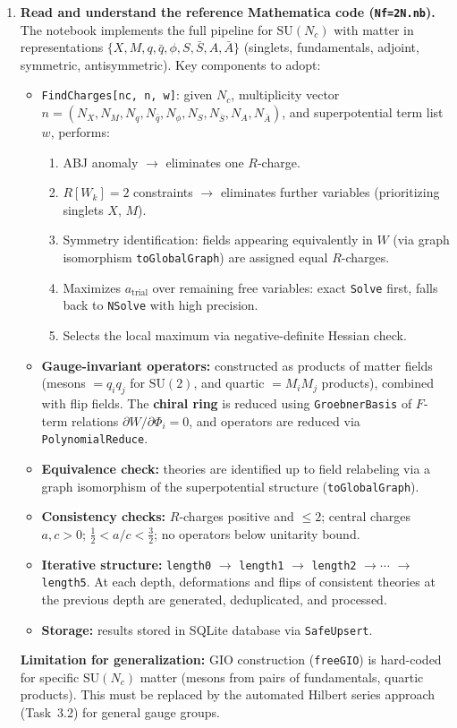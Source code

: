\documentclass[12pt]{article}
\begin{document}
\begin{enumerate}[label=\textbf{0.\arabic*}]
\item \textbf{Read and understand the reference Mathematica code (\texttt{Nf=2N.nb}).} \\
  The notebook implements the full pipeline for $\mathrm{SU}(N_c)$ with matter in
  representations $\{X, M, q, \bar{q}, \phi, S, \bar{S}, A, \bar{A}\}$
  (singlets, fundamentals, adjoint, symmetric, antisymmetric).
  Key components to adopt:
  \begin{itemize}
    \item \texttt{FindCharges[nc, n, w]}: given $N_c$, multiplicity vector $n = (N_X, N_M, N_q, N_{\bar{q}}, N_\phi, N_S, N_{\bar{S}}, N_A, N_{\bar{A}})$, and superpotential term list $w$, performs:
    \begin{enumerate}[label=\arabic*.]
      \item ABJ anomaly $\to$ eliminates one $R$-charge.
      \item $R[W_k] = 2$ constraints $\to$ eliminates further variables (prioritizing singlets $X$, $M$).
      \item Symmetry identification: fields appearing equivalently in $W$ (via graph isomorphism \texttt{toGlobalGraph}) are assigned equal $R$-charges.
      \item Maximizes $a_{\mathrm{trial}}$ over remaining free variables: exact \texttt{Solve} first, falls back to \texttt{NSolve} with high precision.
      \item Selects the local maximum via negative-definite Hessian check.
    \end{enumerate}
    \item \textbf{Gauge-invariant operators:} constructed as products of matter fields (mesons $= q_i q_j$ for $\mathrm{SU}(2)$, and quartic $= M_i M_j$ products), combined with flip fields. The \textbf{chiral ring} is reduced using \texttt{GroebnerBasis} of $F$-term relations $\partial W / \partial \Phi_i = 0$, and operators are reduced via \texttt{PolynomialReduce}.
    \item \textbf{Equivalence check:} theories are identified up to field relabeling via a graph isomorphism of the superpotential structure (\texttt{toGlobalGraph}).
    \item \textbf{Consistency checks:} $R$-charges positive and $\leq 2$; central charges $a,c > 0$; $\tfrac{1}{2} < a/c < \tfrac{3}{2}$; no operators below unitarity bound.
    \item \textbf{Iterative structure:} \texttt{length0} $\to$ \texttt{length1} $\to$ \texttt{length2} $\to \cdots$ $\to$ \texttt{length5}. At each depth, deformations and flips of consistent theories at the previous depth are generated, deduplicated, and processed.
    \item \textbf{Storage:} results stored in SQLite database via \texttt{SafeUpsert}.
  \end{itemize}
  \textbf{Limitation for generalization:} GIO construction (\texttt{freeGIO}) is hard-coded for specific
  $\mathrm{SU}(N_c)$ matter (mesons from pairs of fundamentals, quartic products).
  This must be replaced by the automated Hilbert series approach (Task~3.2) for general gauge groups.


\end{enumerate}
\end{document}
